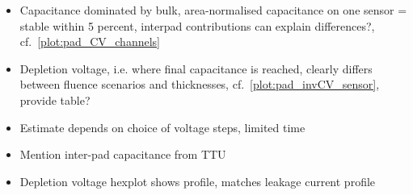 \begin{itemize}
	\item Capacitance dominated by bulk, area-normalised capacitance on one sensor = stable within 5 percent, interpad contributions can explain differences?, cf.~\ref{plot:pad_CV_channels}
	\item Depletion voltage, i.e. where final capacitance is reached, clearly differs between fluence scenarios and thicknesses, cf.~\ref{plot:pad_invCV_sensor}, provide table?
	\item Estimate depends on choice of voltage steps, limited time
	\item Mention inter-pad capacitance from TTU
	\item Depletion voltage hexplot shows profile, matches leakage current profile
\end{itemize}


